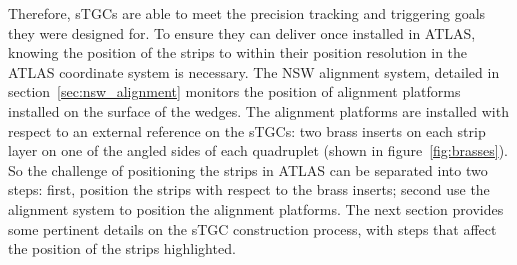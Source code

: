 Therefore, sTGCs are able to meet the precision tracking and triggering goals they were designed for. To ensure they can deliver once installed in ATLAS, knowing the position of the strips to within their position resolution in the ATLAS coordinate system is necessary. The NSW alignment system, detailed in section~\ref{sec:nsw_alignment} monitors the position of alignment platforms installed on the surface of the wedges. The alignment platforms are installed with respect to an external reference on the sTGCs: two brass inserts on each strip layer on one of the angled sides of each quadruplet (shown in figure~\ref{fig:brasses}). So the challenge of positioning the strips in ATLAS can be separated into two steps: first, position the strips with respect to the brass inserts; second use the alignment system to position the alignment platforms. The next section provides some pertinent details on the sTGC construction process, with steps that affect the position of the strips highlighted.

